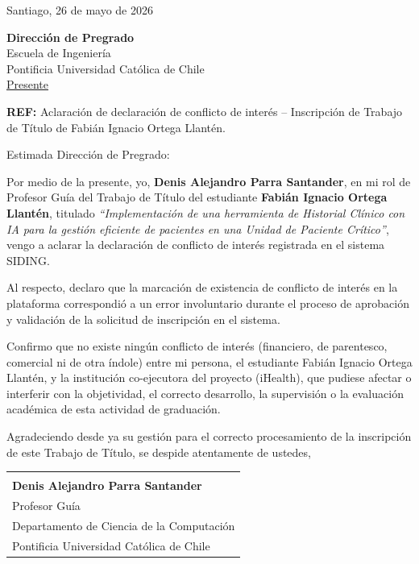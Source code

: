 \documentclass[11pt,a4paper]{article}
\begin{document}
\begin{flushright}
    Santiago, 26 de mayo de 2026
\end{flushright}

\vspace{0.5cm}

\noindent
\textbf{Dirección de Pregrado}\\
Escuela de Ingeniería\\
Pontificia Universidad Católica de Chile\\
\underline{Presente}


\vspace{0.8cm}

\noindent
\textbf{REF:} Aclaración de declaración de conflicto de interés -- Inscripción de Trabajo de Título de Fabián Ignacio Ortega Llantén.

\vspace{0.8cm}

\noindent
Estimada Dirección de Pregrado:

\vspace{0.4cm}

Por medio de la presente, yo, \textbf{Denis Alejandro Parra Santander}, en mi rol de Profesor Guía del Trabajo de Título del estudiante \textbf{Fabián Ignacio Ortega Llantén}, titulado \textit{``Implementación de una herramienta de Historial Clínico con IA para la gestión eficiente de pacientes en una Unidad de Paciente Crítico''}, vengo a aclarar la declaración de conflicto de interés registrada en el sistema SIDING.

Al respecto, declaro que la marcación de existencia de conflicto de interés en la plataforma correspondió a un error involuntario durante el proceso de aprobación y validación de la solicitud de inscripción en el sistema. 

Confirmo que no existe ningún conflicto de interés (financiero, de parentesco, comercial ni de otra índole) entre mi persona, el estudiante Fabián Ignacio Ortega Llantén, y la institución co-ejecutora del proyecto (iHealth), que pudiese afectar o interferir con la objetividad, el correcto desarrollo, la supervisión o la evaluación académica de esta actividad de graduación.

Agradeciendo desde ya su gestión para el correcto procesamiento de la inscripción de este Trabajo de Título, se despide atentamente de ustedes,

\vspace{2cm}

\noindent
\begin{tabular}{@{}l}
    \hline
    \\
    \textbf{Denis Alejandro Parra Santander} \\
    Profesor Guía \\
    Departamento de Ciencia de la Computación \\
    Pontificia Universidad Católica de Chile \\
\end{tabular}
\end{document}
